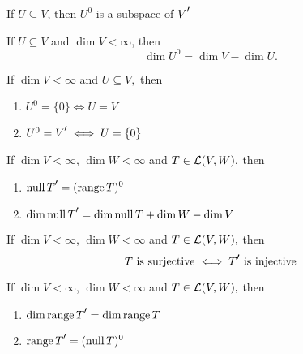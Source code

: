 \setcounter{thm}{123}
\begin{thm}
  \label{thm: the annihilator is a subspace}
  If $U \subseteq V$, then $U^{0}$ is a subspace of $\dual{V}$
\end{thm}

\setcounter{thm}{124}
\begin{thm} 
    If $U\subseteq V$ and $\dim V < \infty$, then
    \begin{equation}
      \dim U^0 = \dim V - \dim U.
    \end{equation}
\end{thm}

\setcounter{thm}{126}
\begin{thm} 
  If $\dim V < \infty$ and $U\subseteq V,$ then
  \begin{enumerate}[label=\textbf{(\alph*)}]
    \item $U^0 = \{0 \} \iff U = V$
    \item $U^0 = \dual{V} \iff U = \{0\}$
   \end{enumerate}
\end{thm}

\begin{thm}
  If $\dim V < \infty$, $\dim W<\infty$ and $T \in \mathcal{L} (V,W),$ then
  \begin{enumerate}[label=\textbf{(\alph*)}]
    \item $\mynull \dual{T} = (\myrange T)^0$
    \item $\dim \mynull \dual{T} = \dim \mynull T + \dim W - \dim V$
  \end{enumerate}
\end{thm}

\begin{thm}
    If $\dim V < \infty$, $\dim W<\infty$ and $T \in \mathcal{L} (V,W),$ then
  \begin{equation}
    T$ is surjective $ \iff \dual{T} $ is injective$
  \end{equation}
\end{thm}

\begin{thm}
    If $\dim V < \infty$, $\dim W<\infty$ and $T \in \mathcal{L} (V,W),$ then
    \begin{enumerate}[label=\textbf{(\alph*)}]
      \item $\dim \myrange \dual{T} = \dim \myrange T$
      \item $\myrange \dual{T} = (\mynull T)^0$
    \end{enumerate}
\end{thm}

